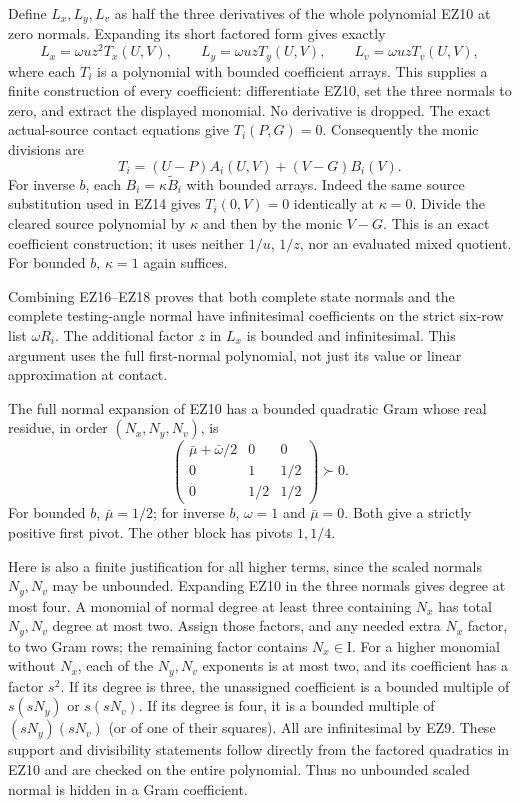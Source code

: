 Define $L_x,L_y,L_v$ as half the three derivatives of the
whole polynomial EZ10 at zero normals. Expanding its short
factored form gives exactly
\[
 L_x=\omega uz^2T_x(U,V),\qquad
 L_y=\omega uzT_y(U,V),\qquad
 L_v=\omega uzT_v(U,V),                                       \tag{EZ17}
\]
where each $T_i$ is a polynomial with bounded coefficient arrays.
This supplies a finite construction of every coefficient:
differentiate EZ10, set the three normals to zero, and extract
the displayed monomial. No derivative is dropped.
The exact actual-source contact equations give $T_i(P,G)=0$.
Consequently the monic divisions are
\[
 T_i=(U-P)A_i(U,V)+(V-G)B_i(V).                               \tag{EZ18}
\]
For inverse $b$, each $B_i=\kappa\widetilde B_i$ with
bounded arrays. Indeed the same source substitution used in
EZ14 gives $T_i(0,V)=0$ identically at $\kappa=0$.
Divide the cleared source polynomial by $\kappa$ and then by
the monic $V-G$. This is an exact coefficient construction;
it uses neither $1/u$, $1/z$, nor an evaluated mixed quotient.
For bounded $b$, $\kappa=1$ again suffices.

Combining EZ16--EZ18 proves that both complete state normals
and the complete testing-angle normal have infinitesimal
coefficients on the strict six-row list $\omega R_i$.
The additional factor $z$ in $L_x$ is bounded and infinitesimal.
This argument uses the full first-normal polynomial, not just
its value or linear approximation at contact.

The full normal expansion of EZ10 has a bounded quadratic Gram
whose real residue, in order $(N_x,N_y,N_v)$, is
\[
 \begin{pmatrix}
  \bar\mu+\bar\omega/2&0&0\\
 0&1&1/2\\
 0&1/2&1/2
 \end{pmatrix}\succ0.                                         \tag{EZ19}
\]
For bounded $b$, $\bar\mu=1/2$; for inverse $b$,
$\omega=1$ and $\bar\mu=0$. Both give a strictly positive
first pivot. The other block has pivots $1,1/4$.

Here is also a finite justification for all higher terms, since
the scaled normals $N_y,N_v$ may be unbounded. Expanding EZ10
in the three normals gives degree at most four. A monomial
of normal degree at least three containing $N_x$ has total
$N_y,N_v$ degree at most two. Assign those factors, and any
needed extra $N_x$ factor, to two Gram rows; the remaining
factor contains $N_x\in\mathrm I$. For a higher monomial
without $N_x$, each of the $N_y,N_v$ exponents is at most two,
and its coefficient has a factor $s^2$. If its degree is
three, the unassigned coefficient is a bounded multiple of
$s(sN_y)$ or $s(sN_v)$. If its degree is four, it is a
bounded multiple of $(sN_y)(sN_v)$ (or of one of their
squares). All are infinitesimal by EZ9. These support and
divisibility statements follow directly from the factored
quadratics in EZ10 and are checked on the entire polynomial.
Thus no unbounded scaled normal is hidden in a Gram coefficient.

